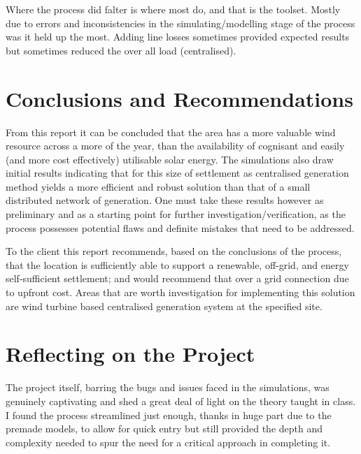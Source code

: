 \documentclass[journal]{IEEEtran}
\begin{document}
Where the process did falter is where most do, and that is the toolset. Mostly due to errors and inconsistencies in the simulating/modelling stage of the process was it held up the most. Adding line losses sometimes provided expected results but sometimes reduced the over all load (centralised).

\section{Conclusions and Recommendations}
From this report it can be concluded that the area has a more valuable wind resource across a more of the year, than the availability of cognisant and easily (and more cost effectively) utilisable solar energy. The simulations also draw initial results indicating that for this size of settlement as centralised generation method yields a more efficient and robust solution than that of a small distributed network of generation. One must take these results however as preliminary and as a starting point for further investigation/verification, as the process possesses potential flaws and definite mistakes that need to be addressed.  

To the client this report recommends, based on the conclusions of the process, that the location is sufficiently able to support a renewable, off-grid, and energy self-sufficient settlement; and would recommend that over a grid connection due to upfront cost.
Areas that are worth investigation for implementing this solution are wind turbine based centralised generation system at the specified site.

\section{Reflecting on the Project}
The project itself, barring the bugs and issues faced in the simulations, was genuinely captivating and shed a great deal of light on the theory taught in class. I found the process streamlined just enough, thanks in huge part due to the premade models, to allow for quick entry but still provided the depth and complexity needed to spur the need for a critical approach in completing it. 


\newpage
\onecolumn
\appendices
\end{document}

